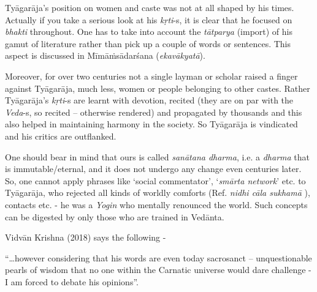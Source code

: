Tyāgarāja’s position on women and caste was not at all shaped by his times. Actually if you take a serious look at his \textit{kṛti}-s, it is clear that he focused on \textit{bhakti} throughout. One has to take into account the \textit{tātparya} (import) of his gamut of literature rather than pick up a couple of words or sentences. This aspect is discussed in Mīmāṁsādarśana (\textit{ekavākyatā}). 

Moreover, for over two centuries not a single layman or scholar raised a finger against Tyāgarāja, much less, women or people belonging to other castes. Rather Tyāgarāja’s \textit{kṛti}-s are learnt with devotion, recited (they are on par with the \textit{Veda}-s, so recited – otherwise rendered) and propagated by thousands and this also helped in maintaining harmony in the society. So Tyāgarāja is vindicated and his critics are outflanked. 

One should bear in mind that ours is called \textit{sanātana dharma}, i.e. a \textit{dharma} that is immutable/eternal, and it does not undergo any change even centuries later. So, one cannot apply phrases like ‘social commentator’, ‘\textit{smārta network}’ etc. to Tyāgarāja, who rejected all kinds of worldly comforts (Ref. \textit{nidhi cāla sukhamā} ), contacts etc. - he was a \textit{Yogin} who mentally renounced the world. Such concepts can be digested by only those who are trained in Vedānta.

Vidvān Krishna (2018) says the following -

\begin{myquote}
“…however considering that his words are even today sacrosanct – unquestionable pearls of wisdom that no one within the Carnatic universe would dare challenge - I am forced to debate his opinions”.
\end{myquote}

